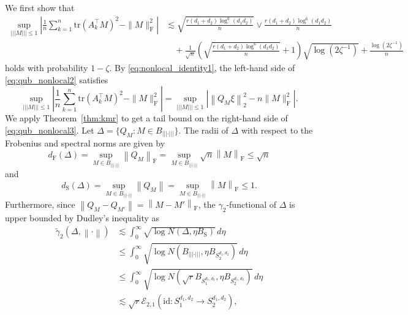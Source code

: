 \documentclass[11pt]{article}
\newcommand{\norm}[1]{\left \|#1 \right \|}
\begin{document}
We first show that 
\begin{equation}
\label{eq:qub_nonlocal2}
\begin{aligned}
\sup_{\vert\vert\vert M\vert\vert\vert \leq 1} \left| \frac{1}{n} \sum_{k=1}^n \mathrm{tr}(A_k^\top M)^2 - \| M \|_\mathrm{F}^2 \right| 
& \lesssim 
\sqrt{\frac{r(d_1+d_2)\log^6(d_1 d_2)}{n}} \vee \frac{r(d_1+d_2)\log^6(d_1 d_2)}{n} \\
& \quad + \frac{1}{\sqrt{n}}
\left ( \sqrt{\frac{r(d_1+d_2)\log^6(d_1 d_2)}{n}} + 1\right ) \sqrt{\log(2\zeta^{-1})} + \frac{\log(2\zeta^{-1})}{n}
\end{aligned}
\end{equation}
holds with probability $1-\zeta$. 
By \eqref{eq:nonlocal_identity1}, the left-hand side of \eqref{eq:qub_nonlocal2} satisfies
\begin{equation}
\label{eq:qub_nonlocal3}
\sup_{\vert\vert\vert M\vert\vert\vert \leq 1} \left| \frac{1}{n} \sum_{k=1}^n \mathrm{tr}(A_k^\top M)^2 - \| M \|_\mathrm{F}^2 \right| 
=
\sup_{\vert\vert\vert M\vert\vert\vert \leq 1} \left|\norm{Q_M \xi}_2^2 - n \| M \|_\mathrm{F}^2 \right|.
\end{equation}
We apply Theorem~\ref{thm:kmr} to get a tail bound on the right-hand side of \eqref{eq:qub_nonlocal3}. Let $\Delta = \{Q_M : M \in B_{\vert\vert\vert\cdot\vert\vert\vert}\}$.
The radii of $\Delta$ with respect to the Frobenius and spectral norms are given by
\[
d_\mathrm{F}(\Delta) = \sup_{M \in B_{\vert\vert\vert\cdot\vert\vert\vert}} \norm{Q_M}_\mathrm{F} = \sup_{M \in B_{\vert\vert\vert\cdot\vert\vert\vert}} \sqrt{n} \norm{M}_\mathrm{F} \leq \sqrt{n}
\]
and
\[
d_\mathrm{S}(\Delta) = \sup_{M \in B_{\vert\vert\vert\cdot\vert\vert\vert}} \norm{Q_M} = \sup_{M \in B_{\vert\vert\vert\cdot\vert\vert\vert}} \norm{M}_\mathrm{F} \leq 1.
\]
Furthermore, since $\norm{Q_M - Q_{M'}} = \norm{M - M'}_\mathrm{F}$, the $\gamma_2$-functional of $\Delta$ is upper bounded by Dudley's inequality as
\begin{align}
    \tilde{\gamma}_2 (\Delta, \norm{\cdot}) 
    & \lesssim \int_0^{\infty} \sqrt{\log N \left(\Delta, \eta B_\mathrm{S} \right)} \, d\eta \nonumber \\
    & \leq \int_0^{\infty} \sqrt{\log N\left ( B_{\vert\vert\vert\cdot\vert\vert\vert}, \eta B_{S_2^{d_1,d_2}} \right )} \, d\eta \nonumber \\
    & \leq \int_0^{\infty} \sqrt{\log N\left ( \sqrt{r} B_{S_1^{d_1,d_2}}, \eta B_{S_2^{d_1,d_2}} \right )} \, d\eta \nonumber \\  
    & \lesssim \sqrt{r} \mathcal{E}_{2,1}(\mathrm{id}: S_1^{d_1,d_2} \rightarrow S_2^{d_1,d_2}), \label{eq:iidG_gamma2}
\end{align}
\end{document}
